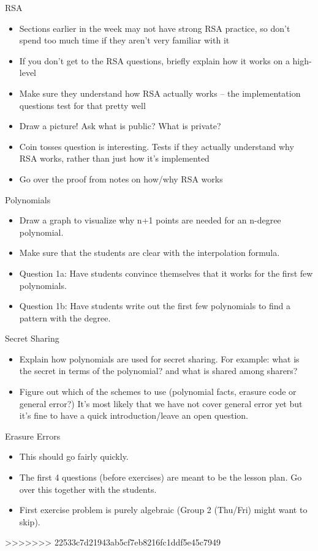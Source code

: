 \documentclass{exam}
\begin{document}
\begin{questions}
	\item RSA
	\begin{itemize}
		\item Sections earlier in the week may not have strong RSA practice, so don’t spend too much time if they aren’t very familiar with it
		\item If you don’t get to the RSA questions, briefly explain how it works on a high-level
		\item Make sure they understand how RSA actually works – the implementation questions test for that pretty well
		\item Draw a picture! Ask what is public? What is private?
		\item Coin tosses question is interesting. Tests if they actually understand why RSA works, rather than just how it’s implemented
		\item Go over the proof from notes on how/why RSA works
	\end{itemize}


	\item Polynomials
	\begin{itemize}
		\item Draw a graph to visualize why n+1 points are needed for an n-degree polynomial.
		\item Make sure that the students are clear with the interpolation formula.
		\item Question 1a: Have students convince themselves that it works for the first few polynomials.
		\item Question 1b: Have students write out the first few polynomials to find a pattern with the degree.
	\end{itemize}

	\item Secret Sharing
	\begin{itemize}
		\item Explain how polynomials are used for secret sharing. For example: what is the secret in terms of the polynomial? and what is shared among sharers?
		\item Figure out which of the schemes to use (polynomial facts, erasure code or general error?) It's most likely that we have not cover general error yet but it's fine to have a quick introduction/leave an open question.
	\end{itemize}


	\item Erasure Errors
	\begin{itemize}
		\item This should go fairly quickly.
		\item The first 4 questions (before exercises) are meant to be the lesson plan. Go over this together with the students.
		\item First exercise problem is purely algebraic (Group 2 (Thu/Fri) might want to skip).
	\end{itemize}

>>>>>>> 22533c7d21943ab5cf7eb8216fc1ddf5e45c7949
\end{questions}
\end{document}
